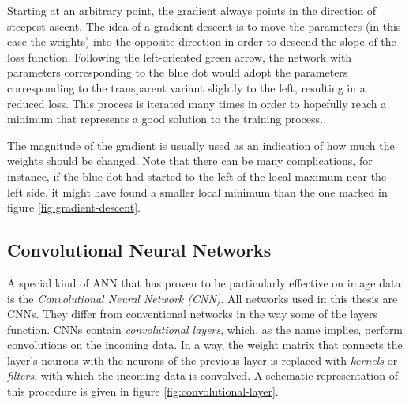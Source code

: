 \documentclass[11pt, a4paper]{article}
\begin{document}
Starting at an arbitrary point, the gradient always points in the direction of steepest ascent. The idea of a gradient descent is to move the parameters (in this case the weights) into the opposite direction in order to descend the slope of the loss function. Following the left-oriented green arrow, the network with parameters corresponding to the blue dot would adopt the parameters corresponding to the transparent variant slightly to the left, resulting in a reduced loss. This process is iterated many times in order to hopefully reach a minimum that represents a good solution to the training process.

The magnitude of the gradient is usually used as an indication of how much the weights should be changed. Note that there can be many complications, for instance, if the blue dot had started to the left of the local maximum near the left side, it might have found a smaller local minimum than the one marked in figure \ref{fig:gradient-descent}.












\subsection{Convolutional Neural Networks}
A special kind of ANN that has proven to be particularly effective on image data is the \emph{Convolutional Neural Network (CNN)}. All networks used in this thesis are CNNs. They differ from conventional networks in the way some of the layers function. CNNs contain \emph{convolutional layers}, which, as the name implies, perform convolutions on the incoming data. In a way, the weight matrix that connects the layer's neurons with the neurons of the previous layer is replaced with \emph{kernels} or \emph{filters}, with which the incoming data is convolved. A schematic representation of this procedure is given in figure \ref{fig:convolutional-layer}.
\end{document}
